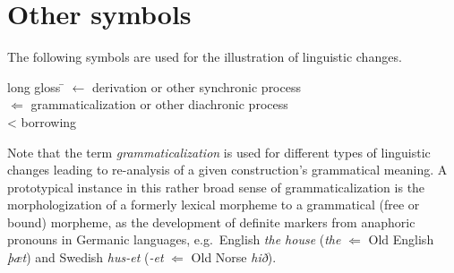 \section*{Other symbols}

The following symbols are used for the illustration of linguistic changes.

\begin{tabbing}
long gloss \= \kill
$\leftarrow$  \> derivation or other synchronic process\\
$\Leftarrow$  \> grammaticalization or other diachronic process\\
<  \> borrowing\\
\end{tabbing}

Note that the term \emph{grammaticalization} is used for different types of linguistic changes leading to re-analysis of a given construction's grammatical meaning. A prototypical instance in this rather broad sense of grammaticalization is the morphologization of a formerly lexical morpheme to a grammatical (free or bound) morpheme, as the development of definite markers from anaphoric pronouns in Germanic languages, e.g.~English \textit{the house} (\textit{the} $\Leftarrow$ Old English \textit{þæt}) and Swedish \textit{hus-et} (\textit{-et} $\Leftarrow$ Old Norse \textit{hið}).
